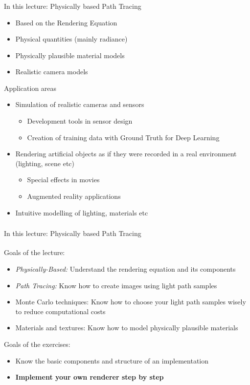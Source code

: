 \documentclass[utf8,stillsansserifmath,fleqn,t]{beamer}
\begin{document}
\begin{frame}
\frametitle{\insertsection}
In this lecture: Physically based Path Tracing
\begin{itemize}
\item Based on the Rendering Equation
\item Physical quantities (mainly radiance)
\item Physically plausible material models
\item Realistic camera models
\end{itemize}
Application areas
\begin{itemize}
\item Simulation of realistic cameras and sensors
    \begin{itemize}
    \item Development tools in sensor design
    \item Creation of training data with Ground Truth for Deep Learning
    \end{itemize}
\item Rendering artificial objects as if they were
recorded in a real environment (lighting, scene etc)
    \begin{itemize}
    \item Special effects in movies
    \item Augmented reality applications
    \end{itemize}
\item Intuitive modelling of lighting, materials etc
\end{itemize}
\end{frame}

\begin{frame}
\frametitle{\insertsection}
In this lecture: Physically based Path Tracing\\~\\[-1ex]
Goals of the lecture:
\begin{itemize}
\item \emph{Physically-Based:} Understand the rendering equation and its components
\item \emph{Path Tracing:} Know how to create images using light path samples
\item Monte Carlo techniques: Know how to choose your light path samples wisely
to reduce computational costs
\item Materials and textures: Know how to model physically plausible materials
\end{itemize}
Goals of the exercises:
\begin{itemize}
\item Know the basic components and structure of an implementation
\item \textbf{Implement your own renderer step by step}
\end{itemize}
\end{frame}
\end{document}
